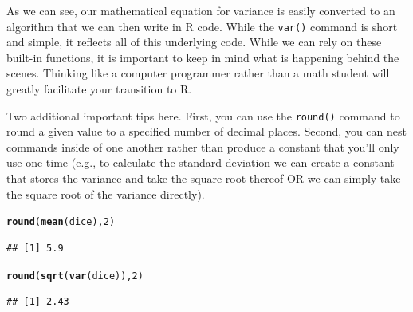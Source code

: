 \documentclass[12pt]{article}\usepackage[]{graphicx}\usepackage[]{color}
\makeatletter
\newcommand{\hlnum}[1]{\textcolor[rgb]{0.686,0.059,0.569}{#1}}%
\newcommand{\hlstd}[1]{\textcolor[rgb]{0.345,0.345,0.345}{#1}}%
\newcommand{\hlkwd}[1]{\textcolor[rgb]{0.737,0.353,0.396}{\textbf{#1}}}%
\newenvironment{kframe}{%
 \def\at@end@of@kframe{}%
 \ifinner\ifhmode%
  \def\at@end@of@kframe{\end{minipage}}%
  \begin{minipage}{\columnwidth}%
 \fi\fi%
 \def\FrameCommand##1{\hskip\@totalleftmargin \hskip-\fboxsep
 \colorbox{shadecolor}{##1}\hskip-\fboxsep
     \hskip-\linewidth \hskip-\@totalleftmargin \hskip\columnwidth}%
 \MakeFramed {\advance\hsize-\width
   \@totalleftmargin\z@ \linewidth\hsize
   \@setminipage}}%
 {\par\unskip\endMakeFramed%
 \at@end@of@kframe}
\newenvironment{knitrout}{}{} %
\makeatother
\begin{document}
As we can see, our mathematical equation for variance is easily converted to an algorithm that we can then write in R code. While the \texttt{var()} command is short and simple, it reflects all of this underlying code. While we can rely on these built-in functions, it is important to keep in mind what is happening behind the scenes. Thinking like a computer programmer rather than a math student will greatly facilitate your transition to R.

Two additional important tips here. First, you can use the \texttt{round()} command to round a given value to a specified number of decimal places. Second, you can nest commands inside of one another rather than produce a constant that you'll only use one time (e.g., to calculate the standard deviation we can create a constant that stores the variance and take the square root thereof OR we can simply take the square root of the variance directly).
\begin{knitrout}
\color{fgcolor}\begin{kframe}
\begin{alltt}
\hlkwd{round}\hlstd{(}\hlkwd{mean}\hlstd{(dice),}\hlnum{2}\hlstd{)}
\end{alltt}
\begin{verbatim}
## [1] 5.9
\end{verbatim}
\begin{alltt}
\hlkwd{round}\hlstd{(}\hlkwd{sqrt}\hlstd{(}\hlkwd{var}\hlstd{(dice)),}\hlnum{2}\hlstd{)}
\end{alltt}
\begin{verbatim}
## [1] 2.43
\end{verbatim}
\end{kframe}
\end{knitrout}
\end{document}
